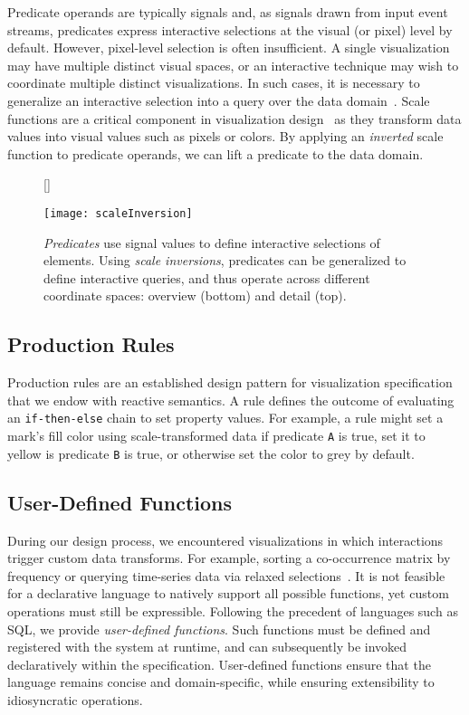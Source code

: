 Predicate operands are typically signals and, as signals drawn from input event
streams, predicates express interactive selections at the visual (or pixel)
level by default. However, pixel-level selection is often insufficient. A single
visualization may have multiple distinct visual spaces, or an interactive
technique may wish to coordinate multiple distinct visualizations. In such
cases, it is necessary to generalize an interactive selection into a query over
the data domain~\cite{heer:generalized}. Scale functions are a critical
component in visualization design~ \cite{wilkinson:grammar} as they transform
data values into visual values such as pixels or colors. By applying an
\emph{inverted} scale function to predicate operands, we can lift a predicate to
the data domain.

\begin{figure}[h!]
  [\FBwidth]
  {\caption{\emph{Predicates} use signal values to define interactive selections
of elements. Using \emph{scale inversions}, predicates can be generalized to
define interactive queries, and thus operate across different coordinate spaces:
overview (bottom) and detail (top).}
  \label{fig:vl:scaleInversion}}
  {\texttt{[image: scaleInversion]}}
\end{figure}

\subsection{Production Rules}

Production rules are an established design pattern for visualization
specification~\cite{heer:designpatterns} that we endow with reactive semantics.
A rule defines the outcome of evaluating an \texttt{if-then-else} chain to set
property values. For example, a rule might set a mark's fill color using
scale-transformed data if predicate \texttt{A} is true, set it to yellow is
predicate \texttt{B} is true, or otherwise set the color to grey by default.

\subsection{User-Defined Functions}

During our design process, we encountered visualizations in which interactions
trigger custom data transforms. For example, sorting a co-occurrence matrix by
frequency or querying time-series data via relaxed
selections~\cite{holz:relaxed}. It is not feasible for a declarative language to
natively support all possible functions, yet custom operations must still be
expressible. Following the precedent of languages such as SQL, we provide
\emph{user-defined functions}. Such functions must be defined and registered
with the system at runtime, and can subsequently be invoked declaratively within
the specification. User-defined functions ensure that the language remains
concise and domain-specific, while ensuring extensibility to idiosyncratic
operations.

